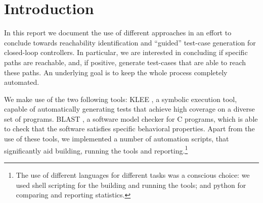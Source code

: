 \documentclass[a4paper, 11pt,twoside]{article}
\begin{document}
\thispagestyle{empty}
\noindent{}

\noindent{}

\renewcommand{\thefootnote}{\fnsymbol{footnote}}

\newpage
\tableofcontents

\section{Introduction}

In this report we document the use of different approaches in an effort to conclude towards reachability identification and “guided” test-case generation for closed-loop controllers. In particular, we are interested in concluding if specific paths are reachable, and, if positive, generate test-cases that are able to reach these paths. An underlying goal is to keep the whole process completely automated.

We make use of the two following tools: KLEE \cite{Cadar2008}, a symbolic execution tool, capable of automatically generating tests that achieve high coverage on a diverse set of programs. BLAST \cite{Beyer2007}, a software model checker for C programs, which is able to check that the software satisfies specific behavioral properties. Apart from the use of these tools, we implemented a number of automation scripts, that significantly aid building, running the tools and reporting.\footnote{The use of different languages for different tasks was a conscious choice: we used shell scripting for the building and running the tools; and python for comparing and reporting statistics.}
\end{document}

